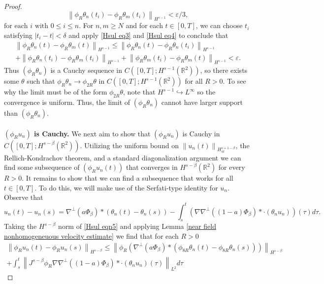 \documentclass[12pt,xcolor=svgnames]{amsart}
\newcommand{\R}{\mathbb{R}}
\newcommand{\eps}{\varepsilon}
\newcommand{\abs}[1]{\mid\!#1\!\mid}
\newcommand{\norm}[2]{\left\lVert#1\right\rVert_{#2}}
\begin{document}
\begin{proof}
\begin{equation}
\label{Hsul eq4}
\norm{\phi_R\theta_n(t_i)-\phi_R\theta_m(t_i)}{H^{s-1}} < \eps/3,
\end{equation}
$\text{for each }i \text{ with } 0 \leq i \leq n.$
For $n,m \geq N$ and for each $t \in [0,T]$, we can choose $t_i$ satisfying $\abs{t_i-t}<\delta$ and apply \eqref{Hsul eq3} and \eqref{Hsul eq4} to conclude that
\begin{multline}
\norm{\phi_R\theta_n(t)-\phi_R\theta_m(t)}{H^{s-1}} \leq \norm{\phi_R\theta_n(t)-\phi_R\theta_n(t_i)}{H^{s-1}}\\
+ \norm{\phi_R\theta_n(t_i)-\phi_R\theta_m(t_i)}{H^{s-1}}+\norm{\phi_R\theta_m(t_i)-\phi_R\theta_m(t)}{H^{s-1}}<\eps.
\end{multline}
Thus $(\phi_R\theta_n)$ is a Cauchy sequence in $C([0,T];H^{s-1}(\R^2))$, so there exists some $\theta$ such that $\phi_R\theta_n \to \phi_{2R}\theta$  in $C([0,T];H^{s-1}(\R^2))$ for all $R>0$. To see why the limit must be of the form $\phi_{2R}\theta$, note that $H^{s-1}\hookrightarrow L^{\infty}$ so the convergence is uniform. Thus, the limit of $(\phi_R\theta_n)$ cannot have larger support than $(\phi_R\theta_n)$.
\\
\\
\textbf{$(\phi_Ru_n)$ is Cauchy.}
We next aim to show that $(\phi_Ru_n)$ is Cauchy in $C([0,T];H^{s-\beta}(\R^2))$. Utilizing the uniform bound on $\norm{u_n(t)}{H_{ul}^{s+1-\beta}}$, the Rellich-Kondrachov theorem, and a standard diagonalization argument we can find some subsequence of $(\phi_Ru_n(t))$ that converges in $H^{s-\beta}(\R^2)$ for every $R>0$. It remains to show that we can find a subsequence that works for all $t\in [0,T]$. To do this, we will make use of the Serfati-type identity for $u_n$. Observe that
\begin{equation}
\label{Hsul eqn5}
u_n(t)-u_n(s) = \nabla^{\perp}(a\Phi_{\beta}) \ast (\theta_n(t)-\theta_n(s)) - \int_s^t (\nabla\nabla^{\perp}((1-a)\Phi_{\beta})\ast\cdot(\theta_nu_n))(\tau)d\tau.
\end{equation}
Taking the $H^{s-\beta}$ norm of \eqref{Hsul eqn5} and applying Lemma \ref{near field nonhomogeneuous velocity estimate} we find that for each $R>0$
\begin{multline}
\label{Hsul eqn6}
\norm{\phi_Ru_n(t)-\phi_Ru_n(s)}{H^{s-\beta}} \leq \norm{\phi_R\left(\nabla^{\perp}( a\Phi_{\beta})\ast(\phi_{8R}\theta_n(t)-\phi_{8R}\theta_n(s))\right)}{H^{s-\beta}}\\
+
\int_s^t \norm{J^{s-\beta}\phi_R\nabla\nabla^{\perp}((1-a)\Phi_{\beta})\ast \cdot (\theta_nu_n)(\tau)}{L^2} d\tau

\end{multline}
\end{proof}
\end{document}
